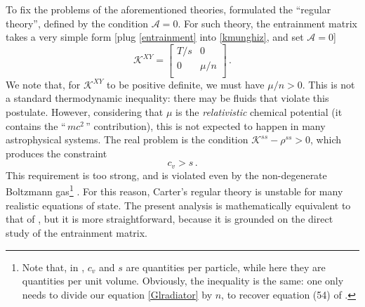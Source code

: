 \documentclass[a4paper, amsfonts, amssymb, amsmath, reprint, showkeys, nofootinbib, twoside, onecolumn,notitlepage]{revtex4-1}
\theoremstyle{definition}
\theoremstyle{theorem}
\begin{document}
To fix the problems of the aforementioned theories, \citet{noto_rel} formulated the ``regular theory'', defined by the condition $\mathcal{A}=0$. For such theory, the entrainment matrix takes a very simple form [plug \eqref{entrainment} into \eqref{kmunghiz}, and set $\mathcal{A}=0$]
\begin{equation}\label{kappuzzo}
\mathcal{K}^{XY}=
\begin{bmatrix}
   T/s & 0  \\
    0 & \mu/n  \\
\end{bmatrix} \, .
\end{equation} 
We note that, for $\mathcal{K}^{XY}$ to be positive definite, we must have $\mu /n >0$. This is not a standard thermodynamic inequality: there may be fluids that violate this postulate. However, considering that $\mu$ is the \textit{relativistic} chemical potential (it contains the ``$ \, mc^2 \,$'' contribution), this is not expected to happen in many astrophysical systems. The real problem is the condition $\mathcal{K}^{ss}-\rho^{ss}>0$, which produces the constraint
\begin{equation}\label{Glradiator}
c_v >s \, .
\end{equation}
This requirement is too strong, and is violated even by the non-degenerate Boltzmann gas\footnote{Note that, in \cite{OlsonRegularCarter1990}, $c_v$ and $s$ are quantities per particle, while here they are quantities per unit volume. Obviously, the inequality is the same: one only needs to divide our equation \eqref{Glradiator} by $n$, to recover equation (54) of \cite{OlsonRegularCarter1990}.} \cite{OlsonRegularCarter1990}. For this reason, Carter's regular theory is unstable for many realistic equations of state. The present analysis is mathematically equivalent to that of \citet{OlsonRegularCarter1990}, but it is more straightforward, because it is grounded on the direct study of the entrainment matrix.
\end{document}
